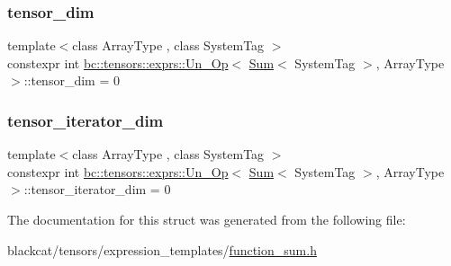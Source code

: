 \subsubsection{\texorpdfstring{tensor\+\_\+dim}{tensor\_dim}}
{\footnotesize\ttfamily template$<$class Array\+Type , class System\+Tag $>$ \\
constexpr int \hyperlink{structbc_1_1tensors_1_1exprs_1_1Un__Op}{bc\+::tensors\+::exprs\+::\+Un\+\_\+\+Op}$<$ \hyperlink{structbc_1_1tensors_1_1exprs_1_1Sum}{Sum}$<$ System\+Tag $>$, Array\+Type $>$\+::tensor\+\_\+dim = 0\hspace{0.3cm}{\ttfamily [static]}}

\mbox{\label{structbc_1_1tensors_1_1exprs_1_1Un__Op_3_01Sum_3_01SystemTag_01_4_00_01ArrayType_01_4_af2e75e16d8290da2370d2b0141cdc0b5}} 
\subsubsection{\texorpdfstring{tensor\+\_\+iterator\+\_\+dim}{tensor\_iterator\_dim}}
{\footnotesize\ttfamily template$<$class Array\+Type , class System\+Tag $>$ \\
constexpr int \hyperlink{structbc_1_1tensors_1_1exprs_1_1Un__Op}{bc\+::tensors\+::exprs\+::\+Un\+\_\+\+Op}$<$ \hyperlink{structbc_1_1tensors_1_1exprs_1_1Sum}{Sum}$<$ System\+Tag $>$, Array\+Type $>$\+::tensor\+\_\+iterator\+\_\+dim = 0\hspace{0.3cm}{\ttfamily [static]}}



The documentation for this struct was generated from the following file\+:\begin{DoxyCompactItemize}
\item 
blackcat/tensors/expression\+\_\+templates/\hyperlink{function__sum_8h}{function\+\_\+sum.\+h}\end{DoxyCompactItemize}
